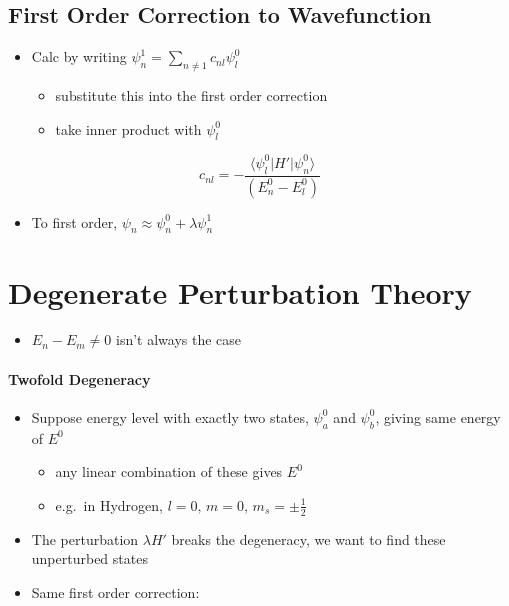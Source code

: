 \documentclass[a4paper,11pt,normalem]{article}
\begin{document}
\subsection{First Order Correction to Wavefunction}\label{first-order-correction-to-wavefunction}

\begin{itemize}
\item
  Calc by writing \(\psi_{n}^1 = \sum_{n \neq 1} c_{nl}\psi_{l}^0\)
  \begin{itemize}
  \item
    substitute this into the first order correction
  \item
    take inner product with \(\psi_{l}^0\)
  \end{itemize}
\end{itemize}

\[
    c_{nl} = -\frac{\langle \psi_{l}^0 | H' | \psi_{n}^0 \rangle}{(E_{n}^0 - E_{l}^0)}
\]

\begin{itemize}
\item
  To first order, \(\psi_n \approx \psi_{n}^0 + \lambda\psi_{n}^1\)
\end{itemize}

\section{Degenerate Perturbation Theory}\label{degenerate-perturbation-theory}

\begin{itemize}
\item
  \(E_n - E_m \neq 0\) isn't always the case
\end{itemize}

\paragraph{Twofold Degeneracy}\label{twofold-degeneracy}

\begin{itemize}
\item
  Suppose energy level with exactly two states, \(\psi_{a}^0\) and
  \(\psi_{b}^0\), giving same energy of \(E^0\)

  \begin{itemize}

  \item
    any linear combination of these gives \(E^0\)
  \item
    e.g.~in Hydrogen, \(l = 0,\, m = 0,\, m_s = \pm \frac{1}{2}\)
  \end{itemize}
\item
  The perturbation \(\lambda H'\) breaks the degeneracy, we want to find
  these unperturbed states
\item
  Same first order correction:
\end{itemize}
\end{document}
